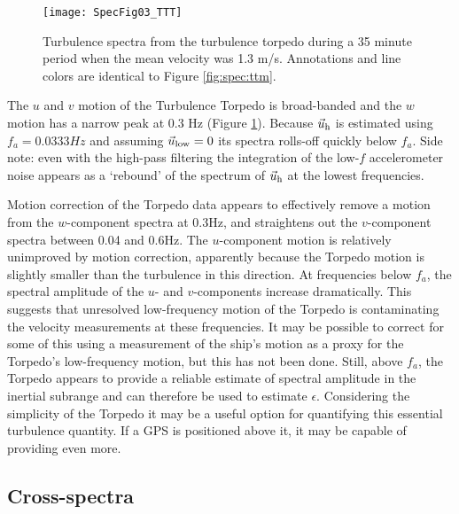 \begin{figure}[t]
  \centering
  \texttt{[image: SpecFig03\_TTT]}
  \caption{Turbulence spectra from the turbulence torpedo during a 35 minute period when the mean velocity was 1.3 m/s. Annotations and line colors are identical to Figure \ref{fig:spec:ttm}.}
  \label{fig:spec:torpedo}
\end{figure}

The $u$ and $v$ motion of the Turbulence Torpedo is broad-banded and the $w$ motion has a narrow peak at 0.3 Hz (Figure \ref{fig:spec:torpedo}). Because $\vec{u}_\mathrm{h}$ is estimated using $f_a = 0.0333Hz$ and assuming $\vec{u}_\mathrm{low}=0$ its spectra rolls-off quickly below $f_a$. Side note: even with the high-pass filtering the integration of the low-$f$ accelerometer noise appears as a `rebound' of the spectrum of $\vec{u}_\mathrm{h}$ at the lowest frequencies.

Motion correction of the Torpedo data appears to effectively remove a motion from the $w$-component spectra at 0.3Hz, and straightens out the $v$-component spectra between 0.04 and 0.6Hz. The $u$-component motion is relatively unimproved by motion correction, apparently because the Torpedo motion is slightly smaller than the turbulence in this direction. At frequencies below $f_a$, the spectral amplitude of the $u$- and $v$-components increase dramatically. This suggests that unresolved low-frequency motion of the Torpedo is contaminating the velocity measurements at these frequencies. It may be possible to correct for some of this using a measurement of the ship's motion as a proxy for the Torpedo's low-frequency motion, but this has not been done. Still, above $f_a$, the Torpedo appears to provide a reliable estimate of spectral amplitude in the inertial subrange and can therefore be used to estimate $\epsilon$. Considering the simplicity of the Torpedo it may be a useful option for quantifying this essential turbulence quantity. If a GPS is positioned above it, it may be capable of providing even more.

\subsection{Cross-spectra}

